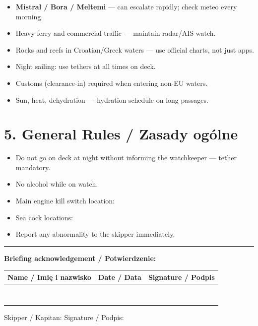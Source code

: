 \documentclass[a4paper,11pt]{article}
\begin{document}
\begin{itemize}[noitemsep]
    \item \textbf{Mistral / Bora / Meltemi} — can escalate rapidly; check meteo every morning.
    \item Heavy ferry and commercial traffic — maintain radar/AIS watch.
    \item Rocks and reefs in Croatian/Greek waters — use official charts, not just apps.
    \item Night sailing: use tethers at all times on deck.
    \item Customs (clearance-in) required when entering non-EU waters.
    \item Sun, heat, dehydration — hydration schedule on long passages.
\end{itemize}

\section*{5. General Rules / Zasady ogólne}

\begin{itemize}[noitemsep]
    \item Do not go on deck at night without informing the watchkeeper — tether mandatory.
    \item No alcohol while on watch.
    \item Main engine kill switch location: \field{4cm}
    \item Sea cock locations: \field{6cm}
    \item Report any abnormality to the skipper immediately.
\end{itemize}

\vspace{0.6cm}
\noindent\rule{\linewidth}{0.4pt}
\vspace{0.2cm}

\noindent\textbf{Briefing acknowledgement / Potwierdzenie:}

\vspace{0.3cm}
\begin{tabularx}{\linewidth}{|X|X|c|}
\hline
\textbf{Name / Imię i nazwisko} & \textbf{Date / Data} & \textbf{Signature / Podpis} \\
\hline
 & & \\[5pt]\hline
 & & \\[5pt]\hline
 & & \\[5pt]\hline
 & & \\[5pt]\hline
 & & \\[5pt]\hline
 & & \\[5pt]\hline
 & & \\[5pt]\hline
 & & \\[5pt]\hline
\end{tabularx}

\vspace{0.5cm}
\noindent Skipper / Kapitan: \field{6cm} \hfill Signature / Podpis: \field{5cm}
\end{document}
